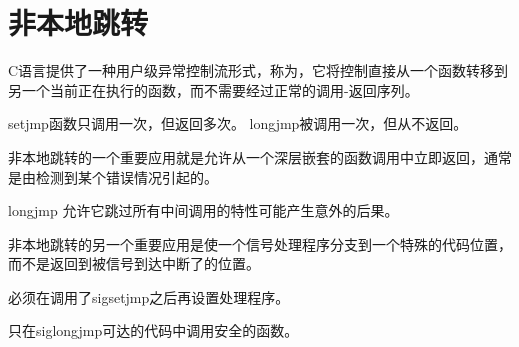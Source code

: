 
\section{非本地跳转}
{
    C语言提供了一种用户级异常控制流形式，称为，它将控制直接从一个函数转移到另一个当前正在执行的函数，而不需要经过正常的调用-返回序列。

    setjmp函数只调用一次，但返回多次。
    longjmp被调用一次，但从不返回。

    非本地跳转的一个重要应用就是允许从一个深层嵌套的函数调用中立即返回，通常是由检测到某个错误情况引起的。

    longjmp 允许它跳过所有中间调用的特性可能产生意外的后果。

    非本地跳转的另一个重要应用是使一个信号处理程序分支到一个特殊的代码位置，而不是返回到被信号到达中断了的位置。

    必须在调用了sigsetjmp之后再设置处理程序。

    只在siglongjmp可达的代码中调用安全的函数。
}
